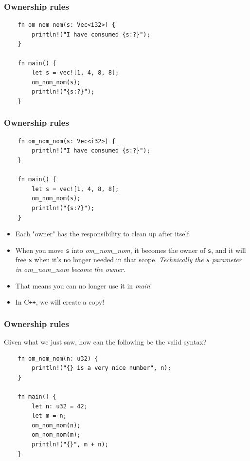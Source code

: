 \documentclass[aspectratio=1610,t]{beamer}
\begin{document}

\begin{frame}[fragile]
\frametitle{Ownership rules}
\begin{verbatim}
    fn om_nom_nom(s: Vec<i32>) {
        println!("I have consumed {s:?}");
    }

    fn main() {
        let s = vec![1, 4, 8, 8];
        om_nom_nom(s);
        println!("{s:?}");
    }
\end{verbatim}
\end{frame}


\begin{frame}[fragile]
\frametitle{Ownership rules}
\begin{verbatim}
    fn om_nom_nom(s: Vec<i32>) {
        println!("I have consumed {s:?}");
    }

    fn main() {
        let s = vec![1, 4, 8, 8];
        om_nom_nom(s);
        println!("{s:?}");
    }
\end{verbatim}

\begin{itemize}
    \item Each "owner" has the responsibility to clean up after itself.
    \item When you move \texttt{s} into \textit{om\_nom\_nom}, it becomes the owner of \texttt{s}, and it will free \texttt{s} when it’s no longer needed in that scope. \textit{Technically the \texttt{s} parameter in \textit{om\_nom\_nom} become the owner}.
    \item That means you can no longer use it in \textit{main}!
    \item In C\texttt{++}, we will create a copy!
\end{itemize}
\end{frame}


\begin{frame}[fragile]
\frametitle{Ownership rules}
Given what we just saw, how can the following be the valid syntax?

\begin{verbatim}
    fn om_nom_nom(n: u32) {
        println!("{} is a very nice number", n);
    }

    fn main() {
        let n: u32 = 42;
        let m = n;
        om_nom_nom(n);
        om_nom_nom(m);
        println!("{}", m + n);
    }
\end{verbatim}
\end{frame}
\end{document}
